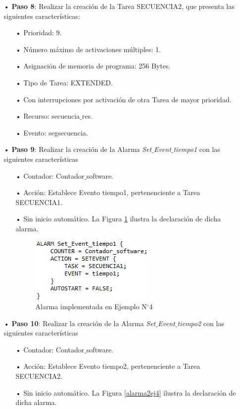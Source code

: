 \documentclass[12pt,letterpaper]{article}
\begin{document}
\begin{enumerate}
\begin{enumerate}
\end{enumerate}
\item[•]\textbf{Paso 8}: Realizar la creación de la Tarea SECUENCIA2, que presenta las siguientes características:
\begin{enumerate}
\item[•]Prioridad: 9.
\item[•]Número máximo de activaciones múltiples: 1.
\item[•]Asignación de memoria de programa: 256 Bytes.
\item[•]Tipo de Tarea: EXTENDED.
\item[•]Con interrupciones por activación de otra Tarea de mayor prioridad.
\item[•]Recurso: secuencia$\_$res.
\item[•]Evento: segsecuencia.
\end{enumerate}
\item[•]\textbf{Paso 9}: Realizar la creación de la Alarma \textit{Set$\_$Event$\_$tiempo1} con las siguientes características
\begin{enumerate}
\item[•]Contador: Contador$\_$software.
\item[•]Acción: Establece Evento tiempo1, pertenenciente a Tarea SECUENCIA1.
\item[•]Sin inicio automático. La Figura \ref{alarmaej4} ilustra la declaración de dicha alarma.
\begin{figure}[H]
\centering
\includegraphics[width=5 cm]{figuras/f50.png}
\caption{Alarma implementada en Ejemplo N$^{\circ}$4}
\label{alarmaej4}
\end{figure}
\end{enumerate}
\item[•]\textbf{Paso 10}: Realizar la creación de la Alarma \textit{Set$\_$Event$\_$tiempo2} con las siguientes características
\begin{enumerate}
\item[•]Contador: Contador$\_$software.
\item[•]Acción: Establece Evento tiempo2, pertenenciente a Tarea SECUENCIA2.
\item[•]Sin inicio automático. La Figura \ref{alarma2ej4} ilustra la declaración de dicha alarma.

\end{enumerate}
\end{enumerate}
\end{document}

